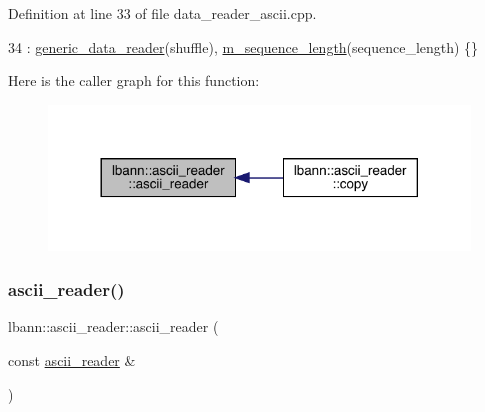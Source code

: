 Definition at line 33 of file data\+\_\+reader\+\_\+ascii.\+cpp.


\begin{DoxyCode}
34   : \hyperlink{classlbann_1_1generic__data__reader_aaba933b8f7c1227801f6e80d39986af4}{generic\_data\_reader}(shuffle), \hyperlink{classlbann_1_1ascii__reader_a5788fa7418a086de968929d0d4cb4fa4}{m\_sequence\_length}(sequence\_length) \{\}
\end{DoxyCode}
Here is the caller graph for this function\+:\nopagebreak
\begin{figure}[H]
\begin{center}
\leavevmode
\includegraphics[width=317pt]{classlbann_1_1ascii__reader_a5a7b563d58c20eeffad4e5e2a96734bb_icgraph}
\end{center}
\end{figure}
\mbox{\label{classlbann_1_1ascii__reader_ae2b30b72049490b5e9cf868ad400692a}} 
\subsubsection{\texorpdfstring{ascii\+\_\+reader()}{ascii\_reader()}\hspace{0.1cm}{\footnotesize\ttfamily [2/2]}}
{\footnotesize\ttfamily lbann\+::ascii\+\_\+reader\+::ascii\+\_\+reader (\begin{DoxyParamCaption}\item[{const \hyperlink{classlbann_1_1ascii__reader}{ascii\+\_\+reader} \&}]{ }\end{DoxyParamCaption})\hspace{0.3cm}{\ttfamily [default]}}

\mbox{\label{classlbann_1_1ascii__reader_a7f974a0e609047e1a5d1df194d33a79d}} 
